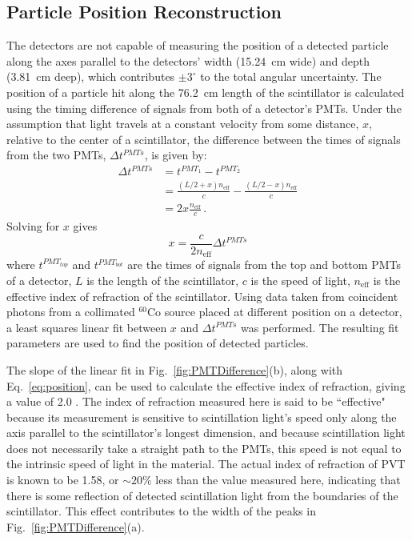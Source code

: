 \subsection{Particle Position Reconstruction}
The detectors are not capable of measuring the position of a detected particle along the axes parallel to the detectors' width (15.24~cm wide) and depth (3.81~cm deep), which contributes $\pm3^{\circ}$ to the total angular uncertainty.
The position of a particle hit along the 76.2~cm length of the scintillator is calculated using the timing difference of signals from both of a detector's PMTs.
Under the assumption that light travels at a constant velocity from some distance, $x$, relative to the center of a scintillator, the difference between the times of signals from the two PMTs, $\Delta t^{PMTs}$, is given by:
\begin{equation}
\begin{split}
\Delta t^{PMTs} & = t^{PMT_1}-t^{PMT_2} \\ 
& = \frac{(L/2 + x) n_{\text{eff}}}{c} - \frac{(L/2-x) n_{\text{eff}}}{c} \\
& = 2x \frac{n_{\text{eff}}}{c}  \, .
\end{split}
\end{equation}
Solving for $x$ gives 
\begin{equation}
\label{eq:position}
x = \frac{c}{2n_{\text{eff}}} \Delta t^{PMTs} 
\end{equation}
where $t^{PMT_{top}}$ and $t^{PMT_{bot}}$ are the times of signals from the top and bottom PMTs of a detector, $L$ is the length of the scintillator, $c$ is the speed of light, $n_{\text{eff}}$ is the effective index of refraction of the scintillator.
Using data taken from coincident photons from a collimated $^{60}$Co source placed at different position on a detector, a least squares linear fit between $x$ and $\Delta t^{PMTs}$ was performed.
The resulting fit parameters are used to find the position of detected particles.

The slope of the linear fit in Fig.~\ref{fig:PMTDifference}(b), along with Eq.~\ref{eq:position}, can be used to calculate the effective index of refraction, giving a value of 2.0 .
The index of refraction measured here is said to be ``effective" because its measurement is sensitive to scintillation light's speed only along the axis parallel to the scintillator's longest dimension, and because scintillation light does not necessarily take a straight path to the PMTs, this speed is not equal to the intrinsic speed of light in the material.
The actual index of refraction of PVT is known to be 1.58, or $\sim{20}\%$ less than the value measured here, indicating that there is some reflection of detected scintillation light from the boundaries of the scintillator.
This effect contributes to the width of the peaks in Fig.~\ref{fig:PMTDifference}(a).

